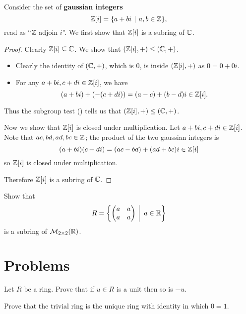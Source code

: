 \begin{example}
    Consider the set of \textbf{gaussian integers}
    \[
        \Z[i] = \{a + bi \vert a,b\in\mathbb{Z}\},
    \]
    read as ``$\mathbb{Z}$ adjoin $i$''. We first show that $\mathbb{Z}[i]$ is a subring of $\mathbb{C}$.
    \begin{proof}
        Clearly $\mathbb{Z}[i] \subseteq \mathbb{C}$. We show that $(\mathbb{Z}[i], +) \leq (\mathbb{C}, +)$.
        \begin{itemize}
            \item Clearly the identity of $(\mathbb{C}, +)$, which is 0, is inside $(\mathbb{Z}[i], +)$ as $0 = 0 + 0i$.
            \item For any $a + bi, c+di \in \mathbb{Z}[i]$, we have
            \[
                (a+bi) + (-(c+di)) = (a-c) + (b-d)i \in \mathbb{Z}[i].
            \]
        \end{itemize}
        Thus the subgroup test () tells us that $(\mathbb{Z}[i], +) \leq (\mathbb{C}, +)$.

        Now we show that $\mathbb{Z}[i]$ is closed under multiplication. Let $a + bi, c+di \in \mathbb{Z}[i]$. Note that $ac, bd, ad, bc \in \mathbb{Z}$; the product of the two gaussian integers is
        \[
            (a+bi)(c+di) = (ac-bd) + (ad+bc)i \in \mathbb{Z}[i]
        \]
        so $\mathbb{Z}[i]$ is closed under multiplication.
        
        Therefore $\mathbb{Z}[i]$ is a subring of $\mathbb{C}$.
    \end{proof}
\end{example}
\begin{exercise}
    Show that
    \[
        R = \left\{\begin{pmatrix}a&a\\a&a\end{pmatrix} \vert a \in \R\right\}
    \]
    is a subring of $\mathcal{M}_{2\times2}(\mathbb{R})$.
\end{exercise}

\newpage

\section{Problems}
\begin{problem}
    Let $R$ be a ring. Prove that if $u \in R$ is a unit then so is $-u$.
\end{problem}

\begin{problem}
    Prove that the trivial ring is the unique ring with identity in which $0 = 1$.
\end{problem}

